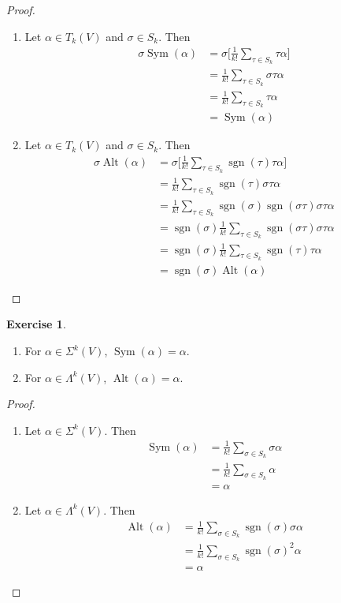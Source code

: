 \documentclass{book}
\theoremstyle{definition}
\newtheorem{ex}[definition]{Exercise}
\newcommand{\al}{\alpha}
\newcommand{\sig}{\sigma}
\newcommand{\Lam}{\Lambda}
\newcommand{\Sig}{\Sigma}
\DeclareMathOperator{\sgn}{sgn}
\DeclareMathOperator{\Sym}{Sym}
\DeclareMathOperator{\Alt}{Alt}
\DeclareMathOperator*{\0}{\mbf{0}}
\DeclareMathOperator*{\1}{\mbf{1}}
\begin{document}
	\begin{proof}\
		\begin{enumerate}
			\item Let $\al \in T_k(V)$ and $\sig \in S_k$. Then 
			\begin{align*}
				\sig \Sym(\al) 
				&= \sig \bigg[ \frac{1}{k!}\sum_{\tau \in S_k} \tau \al \bigg]\\
				&= \frac{1}{k!} \sum_{\tau \in S_k} \sig \tau \al \\
				&= \frac{1}{k!} \sum_{\tau \in S_k} \tau \al \\
				&= \Sym(\al)
			\end{align*} 
			\item Let $\al \in T_k(V)$ and $\sig \in S_k$. Then 
			\begin{align*}
				\sig \Alt(\al) 
				&= \sig \bigg[ \frac{1}{k!}\sum_{\tau \in S_k} \sgn(\tau)\tau \al \bigg] \\
				&= \frac{1}{k!}\sum_{\tau \in S_k} \sgn(\tau) \sig \tau \al \\
				&= \frac{1}{k!} \sum_{\tau \in S_k} \sgn(\sig) \sgn(\sig \tau) \sig \tau \al \\
				&= \sgn(\sig) \frac{1}{k!} \sum_{\tau \in S_k} \sgn(\sig \tau) \sig \tau \al \\
				&= \sgn(\sig) \frac{1}{k!} \sum_{\tau \in S_k} \sgn(\tau)\tau \al \\
				&= \sgn(\sig)\Alt(\al)
			\end{align*} 
		\end{enumerate}
	\end{proof}

	\begin{ex} \
		\begin{enumerate}
			\item For $\al \in \Sig^k(V)$, $\Sym(\al) = \al$.
			\item For $\al \in \Lam^k(V)$, $\Alt(\al) = \al$.
		\end{enumerate}
	\end{ex}

	\begin{proof}\
		\begin{enumerate}
			\item Let $\al \in \Sig^k(V)$. Then 
			\begin{align*}
				\Sym(\al) 
				&= \frac{1}{k!} \sum_{\sig \in S_k} \sig \al \\
				&= \frac{1}{k!} \sum_{\sig \in S_k} \al \\
				&= \al
			\end{align*}
			\item Let $\al \in \Lam^k(V)$. Then 
			\begin{align*}
				\Alt(\al) 
				&= \frac{1}{k!} \sum_{\sig \in S_k} \sgn(\sig)\sig \al \\
				&= \frac{1}{k!} \sum_{\sig \in S_k} \sgn(\sig)^2 \al \\
				&= \al
			\end{align*}
		\end{enumerate}
	\end{proof}
\end{document}

